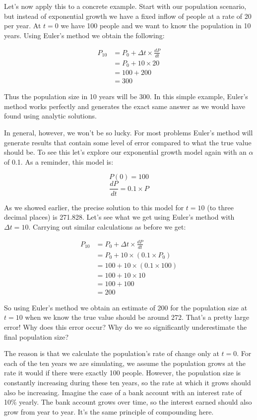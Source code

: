 \documentclass[]{memoir}
\begin{document}
Let's now apply this to a concrete example. Start with our population
scenario, but instead of exponential growth we have a fixed inflow of
people at a rate of 20 per year. At $t=0$ we have 100 people and we want
to know the population in 10 years. Using Euler's method we obtain the
following:

\[
\begin{aligned}
P_{10} &= P_0 + \Delta t \times \frac{dP}{dt} \\
&= P_0 + 10 \times 20 \\
&= 100 + 200 \\
&= 300
\end{aligned}
\]

Thus the population size in 10 years will be 300. In this simple
example, Euler's method works perfectly and generates the exact same
answer as we would have found using analytic solutions.

In general, however, we won't be so lucky. For most problems Euler's
method will generate results that contain some level of error compared
to what the true value should be. To see this let's explore our
exponential growth model again with an $\alpha$ of 0.1. As a reminder,
this model is:

\[ P(0) = 100 \] \[ \frac{dP}{dt} = 0.1 \times P \]

As we showed earlier, the precise solution to this model for $t=10$ (to
three decimal places) is 271.828. Let's see what we get using Euler's
method with $\Delta t = 10$. Carrying out similar calculations as before
we get:

\[
\begin{aligned}
P_{10} &= P_0 + \Delta t \times \frac{dP}{dt} \\
&= P_0 + 10 \times (0.1 \times P_0) \\
&= 100 + 10 \times (0.1 \times 100) \\
&= 100 + 10 \times 10 \\
&= 100 + 100 \\
&= 200
\end{aligned}
\]

So using Euler's method we obtain an estimate of 200 for the population
size at $t=10$ when we know the true value should be around 272. That's
a pretty large error! Why does this error occur? Why do we so
significantly underestimate the final population size?

The reason is that we calculate the population's rate of change only at
$t=0$. For each of the ten years we are simulating, we assume the
population grows at the rate it would if there were exactly 100 people.
However, the population size is constantly increasing during these ten
years, so the rate at which it grows should also be increasing. Imagine
the case of a bank account with an interest rate of 10\% yearly. The
bank account grows over time, so the interest earned should also grow
from year to year. It's the same principle of compounding here.
\end{document}
